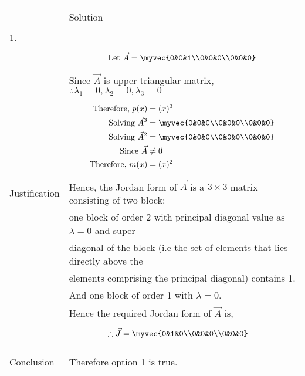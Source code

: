 \onecolumn
\begin{longtable}{|l|l|}
\hline
\multirow{3}{*}{} & \\
Statement&Solution\\
\hline
&\\
1.&\\
&\parbox{6cm}{\begin{align*}
    \mbox{Let }\vec{A}&=\myvec{0&0&1\\0&0&0\\0&0&0}\\
\end{align*}}\\
&Since $\vec{A}$ is upper triangular matrix, $\therefore \lambda_{1}=0,\lambda_{2}=0,\lambda_{3}=0$ \\
&\parbox{6cm}{\begin{align*}
    \mbox{Therefore, }p(x)&=(x)^3\\
    \mbox{Solving }\vec{A}^3&=\myvec{0&0&0\\0&0&0\\0&0&0}\\
    \mbox{Solving }\vec{A}^2&=\myvec{0&0&0\\0&0&0\\0&0&0}\\
    \mbox{Since }\vec{A}&\neq \vec{0}\\
    \mbox{Therefore, }m(x)&=(x)^2\\
    \end{align*}}\\
Justification&Hence, the Jordan form of $\vec{A}$ is a $3 \times 3$ matrix consisting of two block:\\
&one block of order 2 with principal diagonal value as $\lambda = 0$ and super\\
&diagonal of the block (i.e the set of elements that lies directly above the\\
&elements comprising the principal diagonal) contains 1.\\
&And one block of order 1 with $\lambda=0$.\\
&Hence the required Jordan form of $\vec{A}$ is,\\
&\parbox{6cm}{\begin{align*}
    \therefore \vec{J}&=\myvec{0&1&0\\0&0&0\\0&0&0}
\end{align*}}\\
&\\
\hline
&\\
Conclusion&Therefore option 1 is true.\\

\end{longtable}
